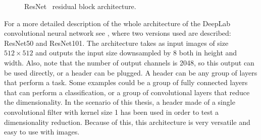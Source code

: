 \begin{figure}[h]
  \centering
  \caption{ResNet~\resnet{} residual block architecture. }
  \label{fig:backbonearchitecture:resnetblock}
\end{figure}

For a more detailed description of the whole architecture of the DeepLab convolutional neural network see , where two versions used are described: ResNet50 and ResNet101.
The architecture takes as input images of size $512 \times 512$ and outputs the input size downsampled by $8$ both in height and width.
Also, note that the number of output channels is 2048, so this output can be used directly, or a header can be plugged.
A header can be any group of layers that perform a task. Some examples could be a group of fully connected layers that can perform a classification,
or a group of convolutional layers that reduce the dimensionality.
In the scenario of this thesis, a header made of a single convolutional filter with kernel size 1 has been used in order to test a dimensionality reduction.
Because of this, this architecture is very versatile and easy to use with images.

